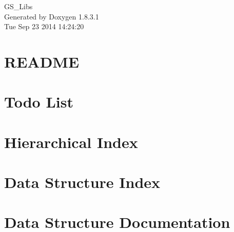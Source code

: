 \documentclass{book}
\begin{document}
\hypersetup{pageanchor=false,citecolor=blue}
\begin{titlepage}
\vspace*{7cm}
\begin{center}
{\Large G\-S\-\_\-\-Libs }\\
\vspace*{1cm}
{\large Generated by Doxygen 1.8.3.1}\\
\vspace*{0.5cm}
{\small Tue Sep 23 2014 14:24:20}\\
\end{center}
\end{titlepage}
\clearemptydoublepage
{}
\tableofcontents
\clearemptydoublepage
{}
\hypersetup{pageanchor=true,citecolor=blue}
\chapter{R\-E\-A\-D\-M\-E}
\label{md_README}
\hypertarget{md_README}{}

\chapter{Todo List}
\label{todo}
\hypertarget{todo}{}

\chapter{Hierarchical Index}

\chapter{Data Structure Index}

\chapter{Data Structure Documentation}








































\printindex
\end{document}
